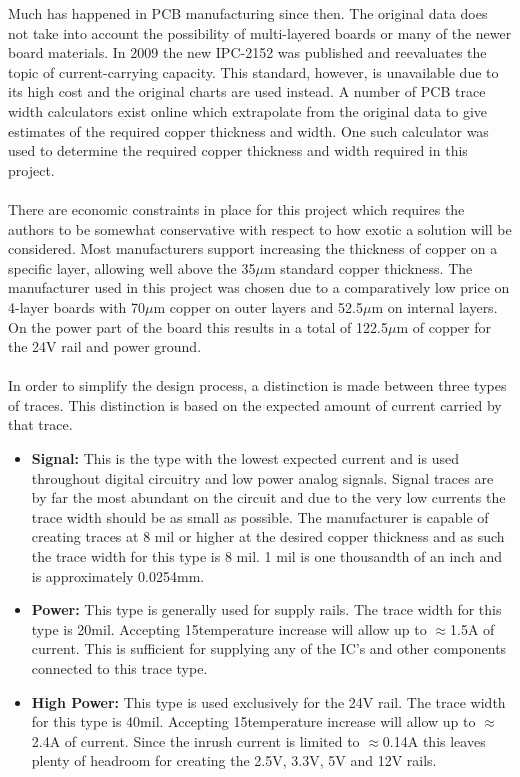 Much has happened in PCB manufacturing since then. 
The original data does not take into account the possibility of multi-layered boards or many of the newer board materials.
In 2009 the new IPC-2152 \cite{ipc2152} was published and reevaluates the topic of current-carrying capacity.
This standard, however, is unavailable due to its high cost and the original charts are used instead.
A number of PCB trace width calculators exist online which extrapolate from the original data to give estimates of the required copper thickness and width.
One such calculator \cite{pcb_trace_calc} was used to determine the required copper thickness and width required in this project.
\\~\\
There are economic constraints in place for this project which requires the authors to be somewhat conservative with respect to how exotic a solution will be considered.
Most manufacturers support increasing the thickness of copper on a specific layer, allowing well above the 35$\mu$m standard copper thickness.
The manufacturer used in this project was chosen due to a comparatively low price on 4-layer boards with 70$\mu$m copper on outer layers and 52.5$\mu$m on internal layers.
On the power part of the board this results in a total of 122.5$\mu$m of copper for the 24V rail and power ground.
\\~\\
In order to simplify the design process, a distinction is made between three types of traces.
This distinction is based on the expected amount of current carried by that trace.
\begin{itemize}
	\item \textbf{Signal:} This is the type with the lowest expected current and is used throughout digital circuitry and low power analog signals.
	Signal traces are by far the most abundant on the circuit and due to the very low currents the trace width should be as small as possible.
	The manufacturer is capable of creating traces at 8 mil or higher at the desired copper thickness and as such the trace width for this type is 8 mil.
	1 mil is one thousandth of an inch and is approximately 0.0254mm.
	\item \textbf{Power:} This type is generally used for supply rails.
	The trace width for this type is 20mil. Accepting 15\degree temperature increase will allow up to $\approx$1.5A of current.
	This is sufficient for supplying any of the IC's and other components connected to this trace type.
	\item \textbf{High Power:} This type is used exclusively for the 24V rail.
	The trace width for this type is 40mil. Accepting 15\degree temperature increase will allow up to $\approx$2.4A of current.
	Since the inrush current is limited to $\approx$0.14A this leaves plenty of headroom for creating the 2.5V, 3.3V, 5V and 12V rails.
\end{itemize}


